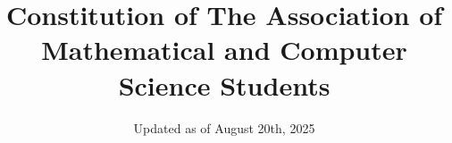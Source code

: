 \documentclass[12pt,a4paper,openany]{book}
\begin{document}
\title{Constitution of The Association of Mathematical and Computer 
Science Students}
\date{Updated as of August 20th, 2025}
\maketitle

\vspace{1cm}












\end{document}
